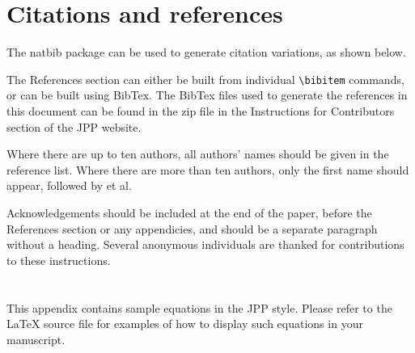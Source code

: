\documentclass[12pt]{RBM_P}
\begin{document}
\section{Citations and references}

The natbib package can be used to generate citation variations, as shown below.
\cite{wenThunderGBMFastGBDTs}


The References section can either be built from individual \verb#\bibitem# commands, or can be built using BibTex. The BibTex files used to generate the references in this document can be found in the zip file in the Instructions for Contributors section of the JPP website.

Where there are up to ten authors, all authors' names should be given in the reference list. Where there are more than ten authors, only the first name should appear, followed by et al.

Acknowledgements should be included at the end of the paper, before the References section or any appendicies, and should be a separate paragraph without a heading. Several anonymous individuals are thanked for contributions to these instructions.

\appendix

\section{}\label{appA}
This appendix contains sample equations in the JPP style. Please refer to the {\LaTeX} source file for examples of how to display such equations in your manuscript.
\end{document}

